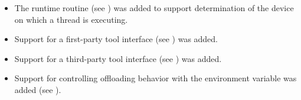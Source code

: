 \begin{itemize}
\item The  runtime routine
      (see ) was added to support
      determination of the device on which a thread is executing.

\item Support for a first-party tool interface (see
      ) was added.

\item Support for a third-party tool interface (see
      ) was added.

\item Support for controlling offloading behavior with the
       environment variable was added
      (see  ).      
      
\end{itemize}


